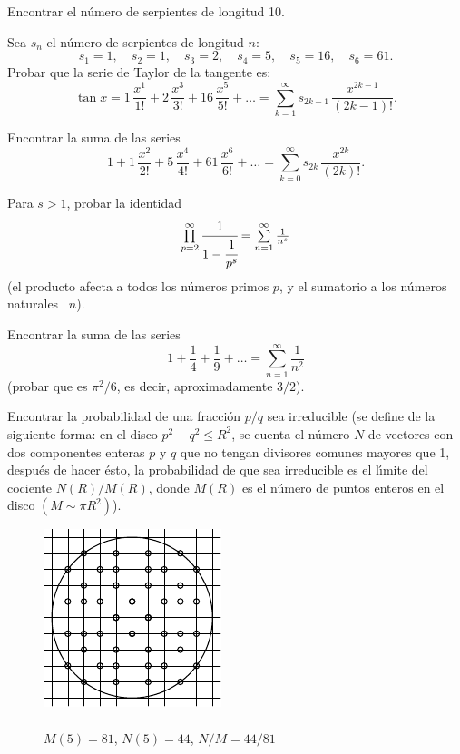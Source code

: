 \documentclass[12pt]{article}  %
\begin{document}
\medskip
\noindent 
Encontrar el n\'umero de serpientes de longitud 10.

\bigskip
{} Sea $s_n$ el n\'umero de serpientes de longitud $n$:
$$
s_1=1, \quad s_2=1, \quad s_3=2, \quad s_4=5, \quad s_5=16, \quad s_6=61.
$$
Probar que la serie de Taylor de la tangente es:
$$
\tan x=1\, \frac{x^1}{1!}+2\, \frac{x^3}{3!}+16\, \frac{x^5}{5!}+\dots=
\textstyle\sum\limits_{k=1}^{\infty} s_{2k-1}\, \frac{x^{2k-1}}{(2k-1)!}.
$$
 

\bigskip
{} Encontrar la suma de las series
$$
1+1\, \frac{x^2}{2!}+5\, \frac{x^4}{4!}+61\, \frac{x^6}{6!}+\dots=
\textstyle\sum\limits_{k=0}^{\infty} s_{2k}\,\frac{x^{2k}}{(2k)!}.
$$

\bigskip
{} Para $s>1$, probar la identidad
$$
\textstyle\prod\limits_{p=2}^{\infty} \cfrac{1}{1-\cfrac{1}{p^s}}=\sum\limits_{n=1}^{\infty} \frac{1}{n^s}
$$ 
(el producto afecta a todos los n\'umeros primos $p$, y el sumatorio a los n\'umeros naturales ~$n$).

\bigskip
{} Encontrar la suma de las series
$$
1+ \frac{1}{4}+ \frac{1}{9}+\dots=\textstyle\sum\limits_{n=1}^{\infty} \frac{1}{n^2}
$$
(probar que es $\pi^2/6$, es decir, aproximadamente $3/2$). 

{} Encontrar la probabilidad de una fracci\'on $p/q$ sea irreducible (se define de la siguiente forma:
en el disco $p^2+q^2 \leqslant R^2$, se cuenta el n\'umero $N$ de vectores con dos componentes enteras $p$ y $q$ que no tengan divisores comunes mayores que 1, despu\'es de hacer \'esto, la probabilidad de que sea irreducible es el l\'{\i}mite del cociente $N(R)/M(R)$, donde $M(R)$ es el n\'umero de puntos enteros en el disco $(M \sim \pi R^2)$).
\begin{figure}[h]
\footnotesize
\centering
\includegraphics{taskbook-36}\\{\ } \\
$M(5)=81$, $N(5)=44$, $N/M = 44/81$
\end{figure}
\end{document}

